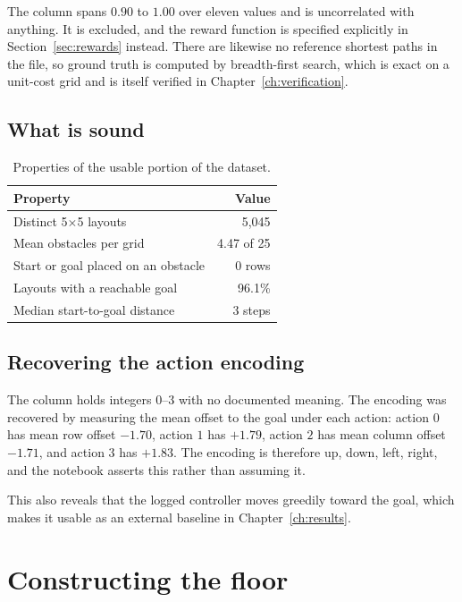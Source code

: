 The  column spans $0.90$ to $1.00$ over eleven values and is uncorrelated with
anything. It is excluded, and the reward function is specified explicitly in
Section~\ref{sec:rewards} instead. There are likewise no reference shortest paths in the file, so
ground truth is computed by breadth-first search, which is exact on a unit-cost grid and is itself
verified in Chapter~\ref{ch:verification}.

\subsection{What is sound}

\begin{table}[ht]
\centering
\caption{Properties of the usable portion of the dataset.}
\begin{tabular}{lr}
\toprule
\textbf{Property} & \textbf{Value} \\
\midrule
Distinct 5$\times$5 layouts              & 5{,}045 \\
Mean obstacles per grid                  & 4.47 of 25 \\
Start or goal placed on an obstacle      & 0 rows \\
Layouts with a reachable goal            & 96.1\% \\
Median start-to-goal distance            & 3 steps \\
\bottomrule
\end{tabular}
\end{table}

\subsection{Recovering the action encoding}

The  column holds integers $0$--$3$ with no documented meaning. The
encoding was recovered by measuring the mean offset to the goal under each action: action $0$ has
mean row offset $-1.70$, action $1$ has $+1.79$, action $2$ has mean column offset $-1.71$, and
action $3$ has $+1.83$. The encoding is therefore up, down, left, right, and the notebook asserts
this rather than assuming it.

This also reveals that the logged controller moves greedily toward the goal, which makes it usable
as an external baseline in Chapter~\ref{ch:results}.

\section{Constructing the floor}

